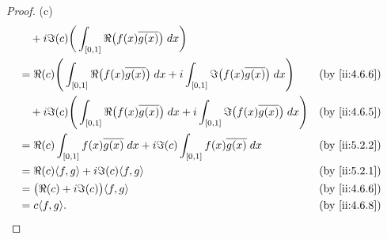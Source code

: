 \begin{proof}{(c)}
\begin{align*}
     & \quad + i \Im(c) \bigg(\int_{[0, 1]} \Re\big(f(x) \overline{g(x)}\big) \; dx\bigg)                                                                                                                  \\
     & = \Re(c) \Bigg(\int_{[0, 1]} \Re\big(f(x) \overline{g(x)}\big) \; dx + i \int_{[0, 1]} \Im\big(f(x) \overline{g(x)}\big) \; dx\Bigg)         &                                      & \by{ii:4.6.6} \\
     & \quad + i \Im(c) \Bigg(\int_{[0, 1]} \Re\big(f(x) \overline{g(x)}\big) \; dx + i \int_{[0, 1]} \Im\big(f(x) \overline{g(x)}\big) \; dx\Bigg) &                                      & \by{ii:4.6.5} \\
     & = \Re(c) \int_{[0, 1]} f(x) \overline{g(x)} \; dx + i \Im(c) \int_{[0, 1]} f(x) \overline{g(x)} \; dx                                        &                                      & \by{ii:5.2.2} \\
     & = \Re(c) \inner*{f, g} + i \Im(c) \inner*{f, g}                                                                                              &                                      & \by{ii:5.2.1} \\
     & = \big(\Re(c) + i \Im(c)\big) \inner*{f, g}                                                                                                  &                                      & \by{ii:4.6.6} \\
     & = c \inner*{f, g}.                                                                                                                           &                                      & \by{ii:4.6.8}
  \end{align*}
\end{proof}

